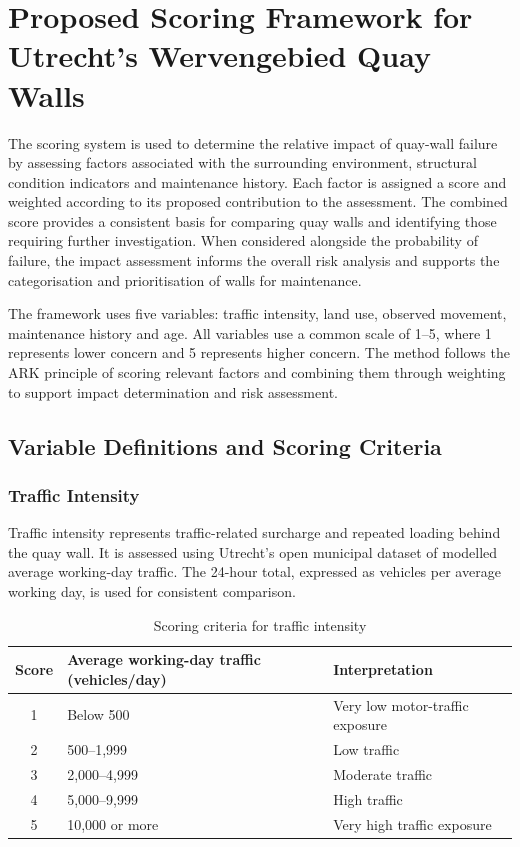 \section{Proposed Scoring Framework for Utrecht's Wervengebied Quay Walls}

The scoring system is used to determine the relative impact of quay-wall failure by assessing factors associated with the surrounding environment, structural condition indicators and maintenance history. Each factor is assigned a score and weighted according to its proposed contribution to the assessment. The combined score provides a consistent basis for comparing quay walls and identifying those requiring further investigation. When considered alongside the probability of failure, the impact assessment informs the overall risk analysis and supports the categorisation and prioritisation of walls for maintenance.


The framework uses five variables: traffic intensity, land use, observed movement, maintenance history and age. All variables use a common scale of 1–5, where 1 represents lower concern and 5 represents higher concern. The method follows the ARK principle of scoring relevant factors and combining them through weighting to support impact determination and risk assessment.

\subsection{Variable Definitions and Scoring Criteria}

\subsubsection{Traffic Intensity}

Traffic intensity represents traffic-related surcharge and repeated loading behind the quay wall. It is assessed using Utrecht's open municipal dataset of modelled average working-day traffic. The 24-hour total, expressed as vehicles per average working day, is used for consistent comparison.

\begin{table}[htbp]
    \centering
    \caption{Scoring criteria for traffic intensity}
    \vspace{2mm}
    \begin{tabularx}{\textwidth}{c X X}
        \toprule
        \textbf{Score} & \textbf{Average working-day traffic (vehicles/day)} & \textbf{Interpretation} \\
        \midrule
        1 & Below 500 & Very low motor-traffic exposure \\
        2 & 500–1,999 & Low traffic \\
        3 & 2,000–4,999 & Moderate traffic \\
        4 & 5,000–9,999 & High traffic \\
        5 & 10,000 or more & Very high traffic exposure \\
        \bottomrule
    \end{tabularx}
\end{table}

